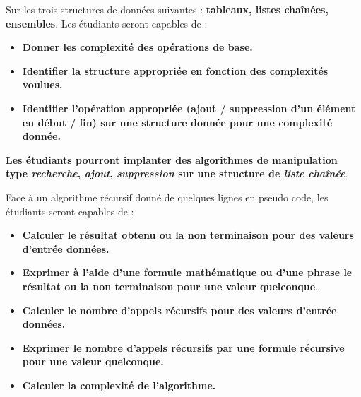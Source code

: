 \documentclass{../cours}
\begin{document}
\begin{aav}
Sur les trois structures de données suivantes : \textbf{tableaux, listes chaînées, ensembles}. Les étudiants seront capables de :
\begin{itemize}
\item \textbf{Donner les complexité des opérations de base.}
\item \textbf{Identifier la structure appropriée en fonction des complexités voulues.}
\item \textbf{Identifier l'opération appropriée (ajout / suppression d'un élément en début / fin) sur une structure donnée pour une complexité donnée.}
\end{itemize}
\end{aav}

\begin{aav}
\textbf{Les étudiants pourront implanter des algorithmes de manipulation  type \emph{recherche}, \emph{ajout}, \emph{suppression} sur une structure de \emph{liste chaînée}}.
\end{aav}

\begin{aav}
Face à un algorithme récursif donné de quelques lignes en pseudo code, les étudiants seront capables de :
\begin{itemize}
\item \textbf{Calculer le résultat obtenu ou la non terminaison pour des valeurs d'entrée données.}
\item \textbf{Exprimer à l'aide d'une formule mathématique ou d'une phrase le résultat ou la non terminaison pour une valeur quelconque}.
\item \textbf{Calculer le nombre d'appels récursifs pour des valeurs d'entrée données.}
\item \textbf{Exprimer le nombre d'appels récursifs par une formule récursive pour une valeur quelconque.}
\item \textbf{Calculer la complexité de l'algorithme.}
\end{itemize}

\end{aav}
\end{document}
